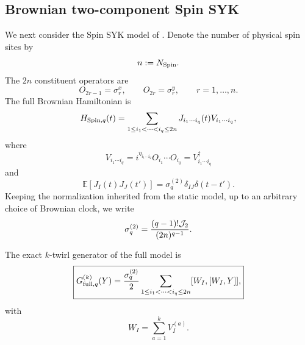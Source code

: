 \documentclass{article}
\theoremstyle{definition}
\begin{document}
\subsection{Brownian two-component Spin SYK}
\label{subsec:brownian_BDN}

We next consider the Spin SYK model of \cite{BasuDasNandy2026}.  Denote the
number of physical spin sites by
\begin{equation}
    n:=N_{\rm Spin}.
\end{equation}
The $2n$ constituent operators are
\begin{equation}
    O_{2r-1}=\sigma_r^x,
    \qquad
    O_{2r}=\sigma_r^y,
    \qquad
    r=1,\ldots,n.
    \label{eq:spinbrown_BDN_O}
\end{equation}
The full Brownian Hamiltonian is
\begin{equation}
    H_{{\rm Spin},q}(t)
    =
    \sum_{1\leq i_1<\cdots<i_q\leq2n}
    J_{i_1\cdots i_q}(t)
    V_{i_1\cdots i_q},
    \label{eq:spinbrown_BDN_full_H}
\end{equation}
where
\begin{equation}
    V_{i_1\cdots i_q}
    =
    i^{\eta_{i_1\cdots i_q}}
    O_{i_1}\cdots O_{i_q}
    =
    V_{i_1\cdots i_q}^\dagger
\end{equation}
and
\begin{equation}
    \mathbb E[
       J_I(t)J_J(t')
    ]
    =
    \sigma_q^{(2)}
    \delta_{IJ}\delta(t-t').
\end{equation}
Keeping the normalization inherited from the static model, up to an
arbitrary choice of Brownian clock, we write
\begin{equation}
    \sigma_q^{(2)}
    =
    \frac{(q-1)!{\cal J}_2}
         {(2n)^{q-1}}.
    \label{eq:spinbrown_BDN_sigma}
\end{equation}

The exact $k$-twirl generator of the full model is
\begin{equation}
    \boxed{
    G_{{\rm full},q}^{(k)}(Y)
    =
    \frac{\sigma_q^{(2)}}{2}
    \sum_{1\leq i_1<\cdots<i_q\leq2n}
    [W_I,[W_I,Y]],
    }
    \label{eq:spinbrown_BDN_full_G}
\end{equation}
with
\begin{equation}
    W_I
    =
    \sum_{a=1}^kV_I^{(a)}.
\end{equation}
\end{document}
